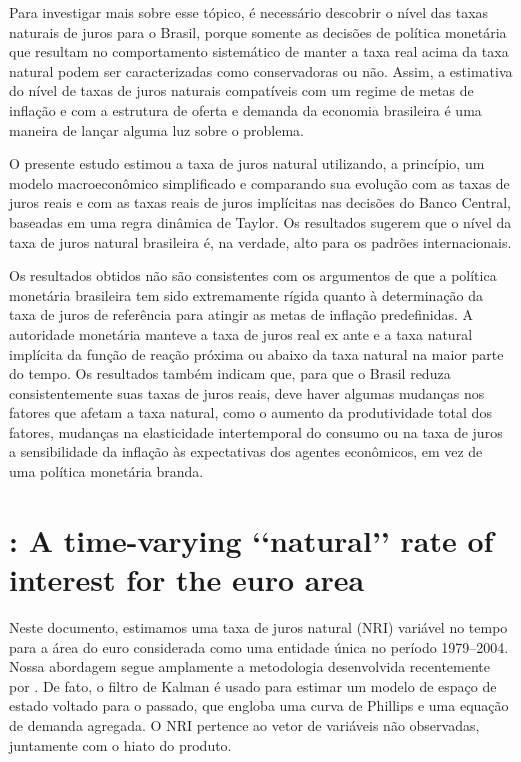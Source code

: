 \documentclass[11pt,oneside,a4paper]{article}
\begin{document}
Para investigar mais sobre esse tópico, é necessário descobrir o nível das taxas naturais de juros para o Brasil, porque somente as decisões de política monetária que resultam no comportamento sistemático de manter a taxa real acima da taxa natural podem ser caracterizadas como conservadoras ou não. Assim, a estimativa do nível de taxas de juros naturais compatíveis com um regime de metas de inflação e com a estrutura de oferta e demanda da economia brasileira é uma maneira de lançar alguma luz sobre o problema.

O presente estudo estimou a taxa de juros natural utilizando, a princípio, um modelo macroeconômico simplificado e comparando sua evolução com as taxas de juros reais e com as taxas reais de juros implícitas nas decisões do Banco Central, baseadas em uma regra dinâmica de Taylor. Os resultados sugerem que o nível da taxa de juros natural brasileira é, na verdade, alto para os padrões internacionais. 

Os resultados obtidos não são consistentes com os argumentos de que a política monetária brasileira tem sido extremamente rígida quanto à determinação da taxa de juros de referência para atingir as metas de inflação predefinidas. A autoridade monetária manteve a taxa de juros real ex ante e a taxa natural implícita da função de reação próxima ou abaixo da taxa natural na maior parte do tempo. Os resultados também indicam que, para que o Brasil reduza consistentemente suas taxas de juros reais, deve haver algumas mudanças nos fatores que afetam a taxa natural, como o aumento da produtividade total dos fatores, mudanças na elasticidade intertemporal do consumo ou na taxa de juros a sensibilidade da inflação às expectativas dos agentes econômicos, em vez de uma política monetária branda.
%
%
\section{\citet{Renne:2007}: A time-varying ‘‘natural’’ rate of interest for the euro area }
Neste documento, estimamos uma taxa de juros natural (NRI) variável no tempo para a área do euro considerada como uma entidade única no período 1979–2004. Nossa abordagem segue amplamente a metodologia desenvolvida recentemente por \citet{LW:2003}. De fato, o filtro de Kalman é usado para estimar um modelo de espaço de estado voltado para o passado, que engloba uma curva de Phillips e uma equação de demanda agregada. O NRI pertence ao vetor de variáveis não observadas, juntamente com o hiato do produto. 
\end{document}
